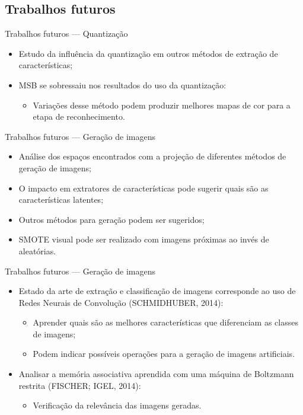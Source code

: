 \documentclass[10pt]{beamer}
\begin{document}
\subsection{Trabalhos futuros}
\begin{frame}{Trabalhos futuros --- Quantização}
  \setlength\leftmargini{1em}
    \begin{itemize}
    \item Estudo da influência da quantização em outros métodos de extração de características;
    \item MSB se sobressaiu nos resultados do uso da quantização:
    \begin{itemize}
      \item Variações desse método podem produzir melhores mapas de cor para a etapa de reconhecimento.
    \end{itemize}
  \end{itemize}
\end{frame}
\begin{frame}{Trabalhos futuros --- Geração de imagens}
  \setlength\leftmargini{1em}
    \begin{itemize}
  \item Análise dos espaços encontrados com a projeção de diferentes métodos de geração de imagens;
  \item O impacto em extratores de características pode sugerir quais são as características latentes;
  \item Outros métodos para geração podem ser sugeridos;
  \item SMOTE visual pode ser realizado com imagens próximas ao invés de aleatórias.
 \end{itemize}
\end{frame}
\begin{frame}{Trabalhos futuros --- Geração de imagens}
  \setlength\leftmargini{1em}
    \begin{itemize}
  \item Estado da arte de extração e classificação de imagens corresponde ao uso de Redes Neurais de Convolução (SCHMIDHUBER, 2014):
    \begin{itemize}
    \item Aprender quais são as melhores características que diferenciam as classes de imagens;
    \item Podem indicar possíveis operações para a geração de imagens artificiais.
    \end{itemize}
  \item Analisar a memória associativa aprendida com uma máquina de Boltzmann restrita (FISCHER; IGEL, 2014):
    \begin{itemize}
    \item Verificação da relevância das imagens geradas.
    \end{itemize}
  \end{itemize}
\end{frame}
\end{document}
